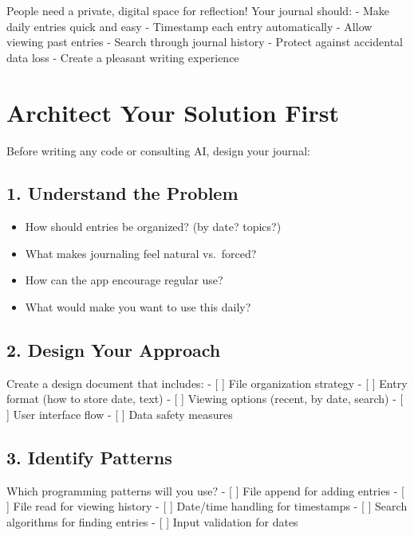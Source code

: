 \documentclass[
  letterpaper,
  DIV=11,
  numbers=noendperiod,
  oneside]{scrreprt}
\providecommand{\tightlist}{%
  \setlength{\itemsep}{0pt}\setlength{\parskip}{0pt}}\usepackage{longtable,booktabs,array}
\begin{document}
People need a private, digital space for reflection! Your journal
should: - Make daily entries quick and easy - Timestamp each entry
automatically - Allow viewing past entries - Search through journal
history - Protect against accidental data loss - Create a pleasant
writing experience

\section{Architect Your Solution
First}\label{architect-your-solution-first-6}

Before writing any code or consulting AI, design your journal:

\subsection{1. Understand the Problem}\label{understand-the-problem-6}

\begin{itemize}
\tightlist
\item
  How should entries be organized? (by date? topics?)
\item
  What makes journaling feel natural vs.~forced?
\item
  How can the app encourage regular use?
\item
  What would make you want to use this daily?
\end{itemize}

\subsection{2. Design Your Approach}\label{design-your-approach-6}

Create a design document that includes: - {[} {]} File organization
strategy - {[} {]} Entry format (how to store date, text) - {[} {]}
Viewing options (recent, by date, search) - {[} {]} User interface flow
- {[} {]} Data safety measures

\subsection{3. Identify Patterns}\label{identify-patterns-6}

Which programming patterns will you use? - {[} {]} File append for
adding entries - {[} {]} File read for viewing history - {[} {]}
Date/time handling for timestamps - {[} {]} Search algorithms for
finding entries - {[} {]} Input validation for dates
\end{document}
